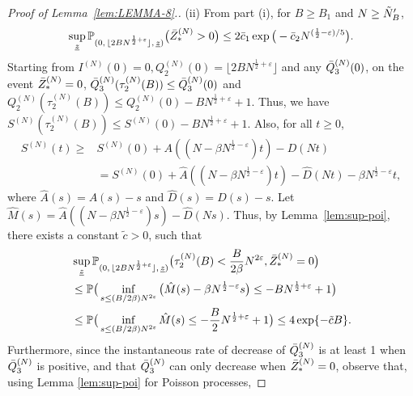 \documentclass[11pt, reqno]{article}
\numberwithin{equation}{section}
\numberwithin{theorem}{section}
\begin{document}
\begin{proof}[Proof of Lemma~\ref{lem:LEMMA-8}.]
\noindent    
(ii) From part (i), for $B\geq B_1$ and $N\geq\Tilde{N}'_B$, 
\begin{equation}\label{eq:lem4.8-z-star}
        \sup_{\underline{z}}\mathbb{P}_{(0, \, \lfloor 2BN^{\frac{1}{2}+\varepsilon} \rfloor, \,\underline{z})}\big(\Bar{Z}^{(N)}_{*}>0\big)\leq 2\bar{c}_1 \exp\big(-\bar{c}_2N^{(\frac{1}{2}-\varepsilon)/5}\big).
    \end{equation}
    Starting from $I^{(N)}(0)=0,Q_2^{(N)}(0)= \lfloor 2BN^{\frac{1}{2}+\varepsilon}\rfloor$ and any $\Bar{Q}^{(N)}_3(0)$,
    on the event $\Bar{Z}^{(N)}_{*}=0$, $\Bar{Q}^{(N)}_3(\tau^{(N)}_2(B))\leq \Bar{Q}^{(N)}_3(0)$ and $Q_2^{(N)}(\tau^{(N)}_2(B))\le Q_2^{(N)}(0)-BN^{\frac{1}{2}+\varepsilon} + 1$. 
    Thus, we have $S^{(N)}(\tau^{(N)}_2(B))\leq S^{(N)}(0)-BN^{\frac{1}{2}+\varepsilon} + 1.$
    Also, for all $t\geq 0$,
    \begin{align*}
        S^{(N)}(t)\geq &S^{(N)}(0)+A((N-\beta N^{\frac{1}{2}-\varepsilon})t)-D(Nt)\\
        &= S^{(N)}(0)+\hat{A}((N-\beta N^{\frac{1}{2}-\varepsilon})t)-\hat{D}(Nt)-\beta N^{\frac{1}{2}-\varepsilon}t,
    \end{align*}
    where $\hat{A}(s)=A(s)-s$ and $\hat{D}(s)=D(s)-s$. Let $\hat{M}(s)=\hat{A}((N-\beta N^{\frac{1}{2}-\varepsilon})s)-\hat{D}(Ns)$.
    Thus, by Lemma~\ref{lem:sup-poi}, there exists a constant $\tilde{c}>0$, such that
    \begin{equation}\label{eq:4.8-1}
    \begin{split}
        &\sup_{\underline{z}}\mathbb{P}_{(0, \, \lfloor 2BN^{\frac{1}{2}+\varepsilon} \rfloor, \,\underline{z})}\big(\tau^{(N)}_2(B)<\frac{B}{2\beta}N^{2\varepsilon},\Bar{Z}^{(N)}_{*}=0\big)\\
        & \leq \mathbb{P}\big(\inf_{s\leq (B/2\beta)N^{2\varepsilon}}\big(\hat{M}(s)-\beta N^{\frac{1}{2}-\varepsilon}s\big)\leq -BN^{\frac{1}{2}+\varepsilon} + 1\big)\\
        & \leq  \mathbb{P}\big(\inf_{s\leq (B/2\beta)N^{2\varepsilon}}\hat{M}(s)\leq -\frac{B}{2}N^{\frac{1}{2}+\varepsilon} + 1\big)
        \leq 4\exp \{-\Tilde{c}B\}.
    \end{split}
    \end{equation}
    Furthermore, since the instantaneous rate of decrease of $\Bar{Q}^{(N)}_3$ is at least 1 when $\Bar{Q}^{(N)}_3$ is positive, and that $\Bar{Q}^{(N)}_3$ can only decrease when $\Bar{Z}^{(N)}_{*}=0$, observe that, using Lemma \ref{lem:sup-poi} for Poisson processes, 

\end{proof}
\end{document}
